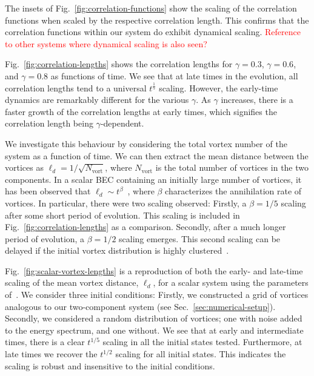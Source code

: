 The insets of Fig.~\ref{fig:correlation-functions} show the scaling of the
correlation functions when scaled by the respective correlation length.
This confirms that the correlation functions within our system do exhibit
dynamical scaling. \textcolor{red}{Reference to other systems where dynamical
scaling is also seen?} \par
Fig.~\ref{fig:correlation-lengths} shows the correlation lengths for
\(\gamma=0.3\), \(\gamma=0.6\), and \(\gamma=0.8\) as functions of time.
We see that at late times in the evolution, all correlation lengths tend to a
universal \(t^\frac{1}{5}\) scaling.
However, the early-time dynamics are remarkably different for the various
\(\gamma \).
As \(\gamma \) increases, there is a faster growth of the correlation lengths at
early times, which signifies the correlation length being \(\gamma \)-dependent.

We investigate this behaviour by considering the total vortex number of
the system as a function of time.
We can then extract the mean distance between the vortices as
\(\ell_d=1/\sqrt{N_\mathrm{vort}}\), where \(N_\mathrm{vort}\) is the total
number of vortices in the two components.
In a scalar BEC containing an initially large number of vortices, it has been
observed that \(\ell_d \sim t^\beta \)~\cite{Karl2017}, where \(\beta \)
characterizes the annihilation rate of vortices.
In particular, there were two scaling observed: Firstly, a \(\beta=1/5\) scaling
after some short period of evolution.
This scaling is included in Fig.~\ref{fig:correlation-lengths} as a comparison.
Secondly, after a much longer period of evolution, a \(\beta=1/2\) scaling
emerges.
This second scaling can be delayed if the initial vortex distribution is
highly clustered~\cite{Karl2017}.

Fig.~\ref{fig:scalar-vortex-lengths} is a reproduction of both the early- and
late-time scaling of the mean vortex distance, \(\ell_d\), for a scalar system
using the parameters of~\cite{Karl2017}.
We consider three initial conditions: Firstly, we constructed a grid of vortices
analogous to our two-component system (see Sec.~\ref{sec:numerical-setup}).
Secondly, we considered a random distribution of vortices; one with noise
added to the energy spectrum, and one without.
We see that at early and intermediate times, there is a clear \(t^{1/5}\)
scaling in all the initial states tested.
Furthermore, at late times we recover the \(t^{1/2}\) scaling for all initial
states.
This indicates the scaling is robust and insensitive to the initial conditions.

